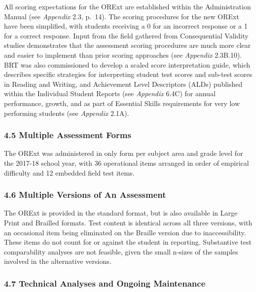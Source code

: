 \documentclass[]{article}
\begin{document}
All scoring expectations for the ORExt are established within the
Administration Manual (see \emph{Appendix} 2.3, p.~14). The scoring
procedures for the new ORExt have been simplified, with students
receiving a 0 for an incorrect response or a 1 for a correct response.
Input from the field gathered from Consequential Validity studies
demonstrates that the assessment scoring procedures are much more clear
and easier to implement than prior scoring approaches (see
\emph{Appendix} 2.3B.10). BRT was also commissioned to develop a scaled
score interpretation guide, which describes specific strategies for
interpreting student test scores and sub-test scores in Reading and
Writing, and Achievement Level Descriptors (ALDs) published within the
Individual Student Reports (see \emph{Appendix} 6.4C) for annual
performance, growth, and as part of Essential Skills requirements for
very low performing students (see \emph{Appendix} 2.1A).

\hypertarget{multiple-assessment-forms}{%
\subsubsection{4.5 Multiple Assessment
Forms}\label{multiple-assessment-forms}}

The ORExt was administered in only form per subject area and grade level
for the 2017-18 school year, with 36 operational items arranged in order
of empirical difficulty and 12 embedded field test items.

\hypertarget{multiple-versions-of-an-assessment}{%
\subsubsection{4.6 Multiple Versions of An
Assessment}\label{multiple-versions-of-an-assessment}}

The ORExt is provided in the standard format, but is also available in
Large Print and Brailled formats. Test content is identical across all
three versions, with an occasional item being eliminated on the Braille
version due to inaccessibility. These items do not count for or against
the student in reporting. Substantive test comparability analyses are
not feasible, given the small n-sizes of the samples involved in the
alternative versions.

\hypertarget{technical-analyses-and-ongoing-maintenance}{%
\subsubsection{4.7 Technical Analyses and Ongoing
Maintenance}\label{technical-analyses-and-ongoing-maintenance}}
\end{document}
